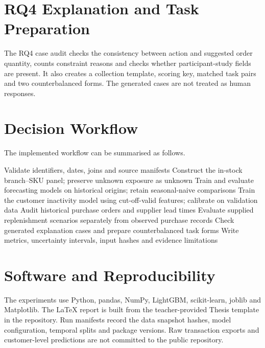 \section{RQ4 Explanation and Task Preparation}
The RQ4 case audit checks the consistency between action and suggested order quantity, counts constraint reasons and checks whether participant-study fields are present. It also creates a collection template, scoring key, matched task pairs and two counterbalanced forms. The generated cases are not treated as human responses.

\section{Decision Workflow}
The implemented workflow can be summarised as follows.

\begin{algorithm}[htbp]
\caption{Evidence-aware SME decision-support workflow}
\label{alg:evidence_workflow}
Validate identifiers, dates, joins and source manifests\;
Construct the in-stock branch--SKU panel; preserve unknown exposure as unknown\;
Train and evaluate forecasting models on historical origins; retain seasonal-naive comparisons\;
Train the customer inactivity model using cut-off-valid features; calibrate on validation data\;
Audit historical purchase orders and supplier lead times\;
Evaluate supplied replenishment scenarios separately from observed purchase records\;
Check generated explanation cases and prepare counterbalanced task forms\;
Write metrics, uncertainty intervals, input hashes and evidence limitations\;
\;
\end{algorithm}

\section{Software and Reproducibility}
The experiments use Python, pandas, NumPy, LightGBM, scikit-learn, joblib and Matplotlib. The LaTeX report is built from the teacher-provided Thesis template in the repository. Run manifests record the data snapshot hashes, model configuration, temporal splits and package versions. Raw transaction exports and customer-level predictions are not committed to the public repository.
